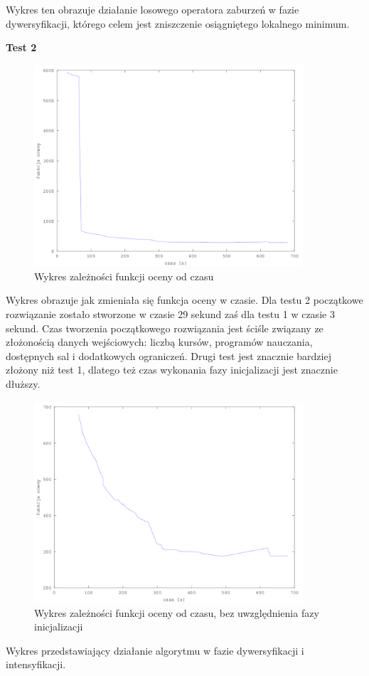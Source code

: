 Wykres ten obrazuje działanie losowego operatora zaburzeń w fazie dywersyfikacji, którego celem jest zniszczenie osiągniętego lokalnego minimum.
\par \textbf{Test 2}
\begin{figure}[H]
  \caption{Wykres zależności funkcji oceny od czasu}
  \centering
    \includegraphics[width=10cm]{ogolny2_instancja.png}
\end{figure}
Wykres obrazuje jak zmieniała się funkcja oceny w czasie. Dla testu 2 początkowe rozwiązanie zostało stworzone w czasie 29 sekund zaś dla testu 1 w czasie 3 sekund. Czas tworzenia początkowego rozwiązania jest ściśle związany ze złożonością danych wejściowych: liczbą kursów, programów nauczania, dostępnych sal i dodatkowych ograniczeń. Drugi test jest znacznie bardziej złożony niż test 1, dlatego też czas wykonania fazy inicjalizacji jest znacznie dłuższy.
\begin{figure}[H]
  \caption{Wykres zależności funkcji oceny od czasu, bez uwzględnienia fazy inicjalizacji}
  \centering
    \includegraphics[width=10cm]{szczegolowy2_instancja.png}
\end{figure}
Wykres przedstawiający działanie algorytmu w fazie dywersyfikacji i intensyfikacji.
